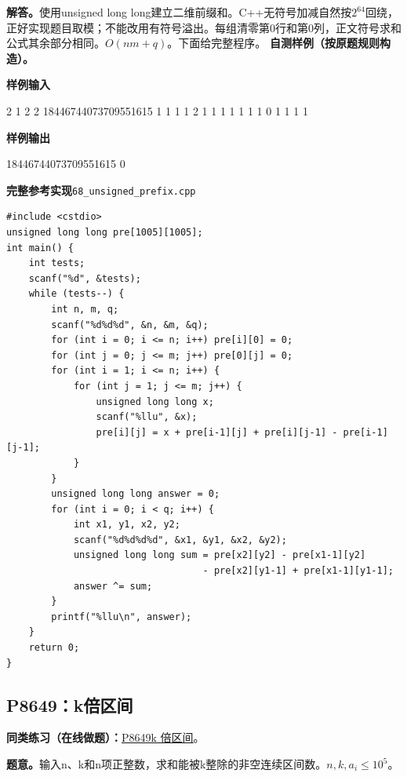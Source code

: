 \documentclass[UTF8,11pt,a4paper,fontset=none]{ctexart}
\newcommand{\practice}[2]{\par\noindent\textbf{同类练习（在线做题）：}\href{https://www.luogu.com.cn/problem/#1}{#1\quad #2}。\par}
\begin{document}
\noindent\textbf{解答。}使用unsigned long long建立二维前缀和。C++无符号加减自然按$2^{64}$回绕，正好实现题目取模；不能改用有符号溢出。每组清零第0行和第0列，正文符号求和公式其余部分相同。$O(nm+q)$。下面给完整程序。
\textbf{自测样例（按原题规则构造）。}
\begin{tcolorbox}[samplebox,title={输入输出样例}]
\textbf{样例输入}
\begin{Sample}
2
1 2 2
18446744073709551615 1
1 1 1 2
1 1 1 1
1 1 1
0
1 1 1 1
\end{Sample}
\tcblower
\textbf{样例输出}
\begin{Sample}
18446744073709551615
0
\end{Sample}
\end{tcolorbox}
\par\noindent\begin{minipage}{\linewidth}
\textbf{完整参考实现}\quad\texttt{68\_unsigned\_prefix.cpp}
\begin{lstlisting}
#include <cstdio>
unsigned long long pre[1005][1005];
int main() {
    int tests;
    scanf("%d", &tests);
    while (tests--) {
        int n, m, q;
        scanf("%d%d%d", &n, &m, &q);
        for (int i = 0; i <= n; i++) pre[i][0] = 0;
        for (int j = 0; j <= m; j++) pre[0][j] = 0;
        for (int i = 1; i <= n; i++) {
            for (int j = 1; j <= m; j++) {
                unsigned long long x;
                scanf("%llu", &x);
                pre[i][j] = x + pre[i-1][j] + pre[i][j-1] - pre[i-1][j-1];
            }
        }
        unsigned long long answer = 0;
        for (int i = 0; i < q; i++) {
            int x1, y1, x2, y2;
            scanf("%d%d%d%d", &x1, &y1, &x2, &y2);
            unsigned long long sum = pre[x2][y2] - pre[x1-1][y2]
                                   - pre[x2][y1-1] + pre[x1-1][y1-1];
            answer ^= sum;
        }
        printf("%llu\n", answer);
    }
    return 0;
}
\end{lstlisting}
\end{minipage}\par


\subsection{P8649：k倍区间}

\practice{P8649}{[蓝桥杯 2017 省 B] k 倍区间}

\noindent\textbf{题意。}输入n、k和n项正整数，求和能被k整除的非空连续区间数。$n,k,a_i\le10^5$。
\end{document}
